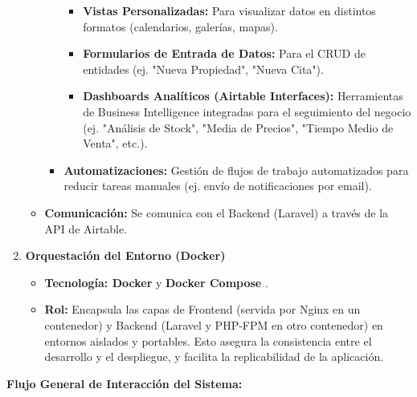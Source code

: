 \begin{enumerate}
\begin{itemize}
\begin{itemize}
            \begin{itemize}
                \item \textbf{Vistas Personalizadas:} Para visualizar datos en distintos formatos (calendarios, galerías, mapas).

                \item \textbf{Formularios de Entrada de Datos:} Para el CRUD de entidades (ej. "Nueva Propiedad", "Nueva Cita").

                \item \textbf{Dashboards Analíticos (Airtable Interfaces):} Herramientas de Business Intelligence integradas para el seguimiento del negocio (ej. "Análisis de Stock", "Media de Precios", "Tiempo Medio de Venta", etc.).
            \end{itemize}

            \item \textbf{Automatizaciones:} Gestión de flujos de trabajo automatizados para reducir tareas manuales (ej. envío de notificaciones por email).
        \end{itemize}

        \item \textbf{Comunicación:} Se comunica con el Backend (Laravel) a través de la API de Airtable.
    \end{itemize}

    \item \textbf{Orquestación del Entorno (Docker)}

    \begin{itemize}
        \item \textbf{Tecnología: Docker}  y \textbf{Docker Compose} \cite{docker2024docs}.

        \item \textbf{Rol:} Encapsula las capas de Frontend (servida por Nginx en un contenedor) y Backend (Laravel y PHP-FPM en otro contenedor) en entornos aislados y portables. Esto asegura la consistencia entre el desarrollo y el despliegue, y facilita la replicabilidad de la aplicación.
    \end{itemize}

\end{enumerate}

\textbf{Flujo General de Interacción del Sistema:}

